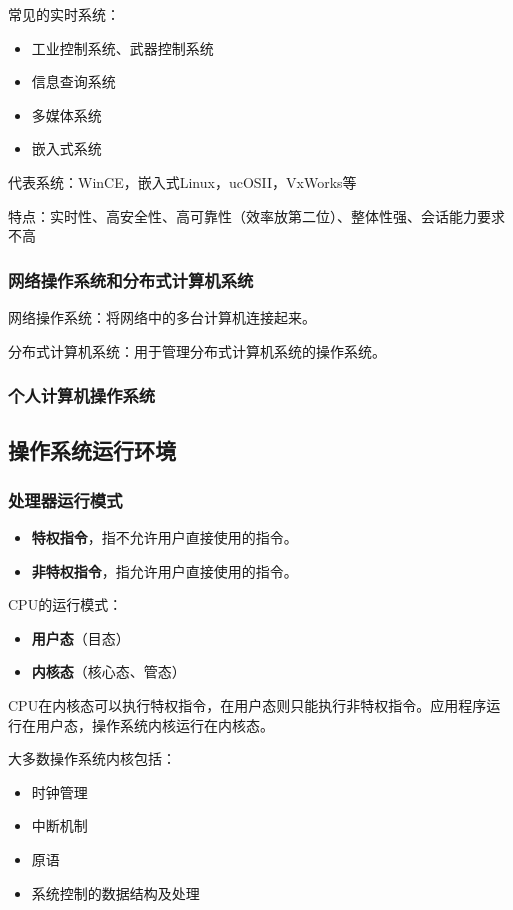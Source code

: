 \documentclass[12pt, a4paper, oneside]{ctexart}
\begin{document}
常见的实时系统：
\begin{itemize}
  \item 工业控制系统、武器控制系统
  \item 信息查询系统
  \item 多媒体系统
  \item 嵌入式系统
\end{itemize}

代表系统：WinCE，嵌入式Linux，ucOSII，VxWorks等

特点：实时性、高安全性、高可靠性（效率放第二位）、整体性强、会话能力要求不高

\subsubsection{网络操作系统和分布式计算机系统}

网络操作系统：将网络中的多台计算机连接起来。

分布式计算机系统：用于管理分布式计算机系统的操作系统。

\subsubsection{个人计算机操作系统}

\subsection{操作系统运行环境}

\subsubsection{处理器运行模式}

\begin{itemize}
  \item {\bf 特权指令}，指不允许用户直接使用的指令。
  \item {\bf 非特权指令}，指允许用户直接使用的指令。
\end{itemize}

CPU的运行模式：
\begin{itemize}
  \item {\bf 用户态}（目态）
  \item {\bf 内核态}（核心态、管态）
\end{itemize}

CPU在内核态可以执行特权指令，在用户态则只能执行非特权指令。应用程序运行在用户态，操作系统内核运行在内核态。

大多数操作系统内核包括：
\begin{itemize}
  \item 时钟管理
  \item 中断机制
  \item 原语
  \item 系统控制的数据结构及处理
\end{itemize}
\end{document}

